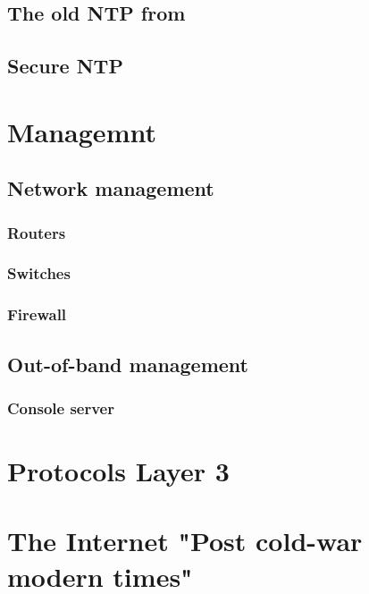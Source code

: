 \documentclass[a4paper,12pt,twoside,twocolumn,landscape]{book}
\begin{document}
\section{The old NTP from }

\section{Secure NTP}

\chapter{Managemnt}

\section{Network management}

\subsection{Routers}

\subsection{Switches}

\subsection{Firewall}

\section{Out-of-band management}

\subsection{Console server}

\chapter{Protocols Layer 3}



\chapter{The Internet {\footnotesize "Post cold-war modern times"}}
\end{document}
